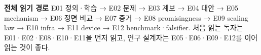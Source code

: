 \begin{readingroute}
\textbf{전체 읽기 경로}\quad
E01 정의·학습 → E02 문제 → E03 계보 → E04 대안 → E05 mechanism → E06 정면 비교 →
E07 증거 → E08 promisingness → E09 scaling law → E10 infra → E11 device → E12 benchmark·falsifier.
처음 읽는 독자는 E01·E02·E08·E10·E11을 먼저 읽고, 연구 설계자는 E05·E06·E09·E12를 이어 읽는 것이 좋다.
\end{readingroute}
\vspace{4mm}
